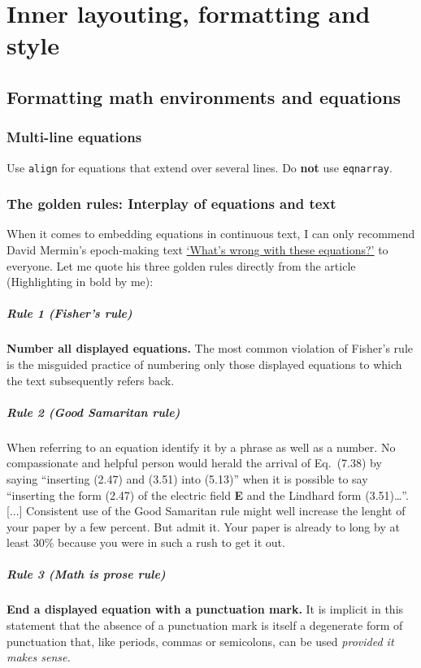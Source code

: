 \chapter{Inner layouting, formatting and style}
\section{Formatting math environments and equations}

\subsection{Multi-line equations}
Use \verb|align| for equations that extend over several lines. Do \textbf{not} use \verb|eqnarray|.

\subsection{The golden rules: Interplay of equations and text}
When it comes to embedding equations in continuous text, I can only recommend David Mermin's epoch-making text \href{https://wp.optics.arizona.edu/kupinski/wp-content/uploads/sites/91/2023/05/MerminEquations.pdf}{`What's wrong with these equations?'} to everyone. Let me quote his three golden rules directly from the article (Highlighting in bold by me):
\paragraph{Rule 1 (Fisher's rule)} \textbf{Number all displayed equations.} The most common violation of Fisher's rule is the misguided practice of numbering only those displayed equations to which the text subsequently refers back.
\paragraph{Rule 2 (Good Samaritan rule)} When referring to an equation identify it by a phrase as well as a number. No compassionate and helpful person would herald the arrival of Eq.~(7.38) by saying ``inserting (2.47) and (3.51) into (5.13)'' when it is possible to say ``inserting the form (2.47) of the electric field \textbf{E} and the Lindhard form (3.51)\dots''. [...] Consistent use of the Good Samaritan rule might well increase the lenght of your paper by a few percent. But admit it. Your paper is already to long by at least 30\% because you were in such a rush to get it out.
\paragraph{Rule 3 (Math is prose rule)} \textbf{End a displayed equation with a punctuation mark.} It is implicit in this statement that the absence of a punctuation mark is itself a degenerate form of punctuation that, like periods, commas or semicolons, can be used \emph{provided it makes sense.}


